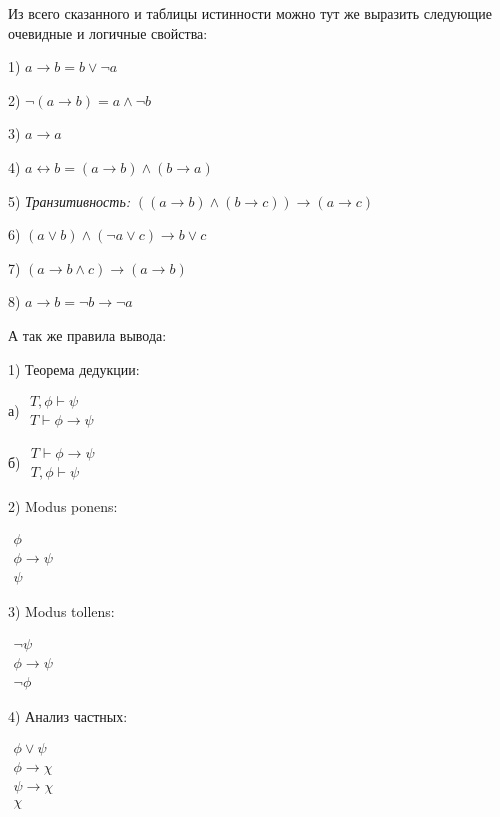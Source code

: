 Из всего сказанного и таблицы истинности можно тут же выразить следующие очевидные и логичные свойства:

1) $a \rightarrow b = b \vee \neg a$

2) $\neg(a \rightarrow b) = a \wedge \neg b$

3) $a \rightarrow a$

4) $a \leftrightarrow b = (a \rightarrow b) \wedge (b\rightarrow a)$

5) {\slshape Транзитивность:} $((a \rightarrow b) \wedge (b \rightarrow c)) \rightarrow (a \rightarrow c)$

6) $(a \vee b) \wedge (\neg a \vee c) \rightarrow b \vee c$

7) $(a \rightarrow b \wedge c) \rightarrow (a \rightarrow b)$

8) $a \rightarrow b = \neg b \rightarrow \neg a$

А так же правила вывода:

1) Теорема дедукции:

а) $\begin{array}{l}T, \phi\vdash\psi\\ \hline T\vdash\phi\rightarrow\psi\end{array}$

б) $\begin{array}{l}T\vdash\phi\rightarrow\psi\\ \hline T, \phi\vdash\psi\end{array}$

2) Modus ponens:

$\begin{array}{l}\phi\\ \phi\rightarrow\psi\\ \hline \psi\end{array}$

3) Modus tollens:

$\begin{array}{l}\neg\psi\\ \phi\rightarrow\psi\\ \hline \neg\phi\end{array}$

4) Анализ частных:

$\begin{array}{l}\phi\vee\psi\\ \phi\rightarrow\chi\\ \psi\rightarrow\chi\\ \hline\chi\end{array}$


